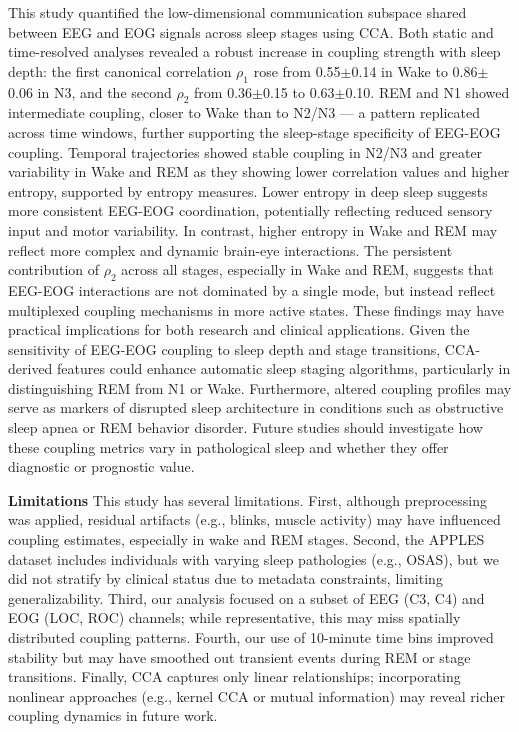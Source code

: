 This study quantified the low-dimensional communication subspace shared between EEG and EOG signals across sleep stages using CCA. Both static and time-resolved analyses revealed a robust increase in coupling strength with sleep depth: the first canonical correlation $\rho_1$ rose from 0.55$\pm$0.14 in Wake to 0.86$\pm$0.06 in N3, and the second $\rho_2$ from 0.36$\pm$0.15 to 0.63$\pm$0.10. REM and N1 showed intermediate coupling, closer to Wake than to N2/N3 --- a pattern replicated across time windows, further supporting the sleep-stage specificity of EEG-EOG coupling.
Temporal trajectories showed stable coupling in N2/N3 and greater variability in Wake and REM as they showing lower correlation values and higher entropy, supported by entropy measures. Lower entropy in deep sleep suggests more consistent EEG-EOG coordination, potentially reflecting reduced sensory input and motor variability. In contrast, higher entropy in Wake and REM may reflect more complex and dynamic brain-eye interactions. The persistent contribution of $\rho_2$ across all stages, especially in Wake and REM, suggests that EEG-EOG interactions are not dominated by a single mode, but instead reflect multiplexed coupling mechanisms in more active states. These findings may have practical implications for both research and clinical applications. Given the sensitivity of EEG-EOG coupling to sleep depth and stage transitions, CCA-derived features could enhance automatic sleep staging algorithms, particularly in distinguishing REM from N1 or Wake. Furthermore, altered coupling profiles may serve as markers of disrupted sleep architecture in conditions such as obstructive sleep apnea or REM behavior disorder. Future studies should investigate how these coupling metrics vary in pathological sleep and whether they offer diagnostic or prognostic value.

\textbf{Limitations}
This study has several limitations. First, although preprocessing was applied, residual artifacts (e.g., blinks, muscle activity) may have influenced coupling estimates, especially in wake and REM stages. Second, the APPLES dataset includes individuals with varying sleep pathologies (e.g., OSAS), but we did not stratify by clinical status due to metadata constraints, limiting generalizability. Third, our analysis focused on a subset of EEG (C3, C4) and EOG (LOC, ROC) channels; while representative, this may miss spatially distributed coupling patterns. Fourth, our use of 10-minute time bins improved stability but may have smoothed out transient events during REM or stage transitions. Finally, CCA captures only linear relationships; incorporating nonlinear approaches (e.g., kernel CCA or mutual information) may reveal richer coupling dynamics in future work.

